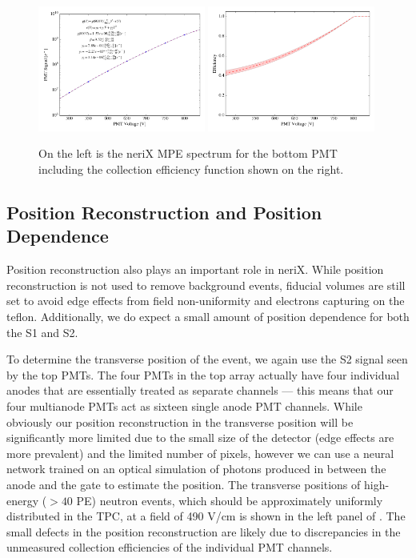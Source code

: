 \begin{figure}[t]
        \centering
	\includegraphics[width=0.49\textwidth]{nerix_mpe_spectrum}
	\includegraphics[width=0.49\textwidth]{nerix_collection_efficiency}
	\caption{On the left is the neriX MPE spectrum for the bottom PMT including the collection efficiency function shown on the right.}
	\label{fig:nerix_mpe}
\end{figure}


\subsection{Position Reconstruction and Position Dependence}

Position reconstruction also plays an important role in neriX.  While position reconstruction is not used to remove background events, fiducial volumes are still set to avoid edge effects from field non-uniformity and electrons capturing on the teflon.  Additionally, we do expect a small amount of position dependence for both the S1 and S2.  

To determine the transverse position of the event, we again use the S2 signal seen by the top PMTs.  The four PMTs in the top array actually have four individual anodes that are essentially treated as separate channels --- this means that our four multianode PMTs act as sixteen single anode PMT channels.  While obviously our position reconstruction in the transverse position will be significantly more limited due to the small size of the detector (edge effects are more prevalent) and the limited number of pixels, however we can use a neural network trained on an optical simulation of photons produced in between the anode and the gate to estimate the position.  The transverse positions of high-energy ($>40$ PE) neutron events, which should be approximately uniformly distributed in the TPC, at a field of 490 V/cm is shown in the left panel of .  The small defects in the position reconstruction are likely due to discrepancies in the unmeasured collection efficiencies of the individual PMT channels.

